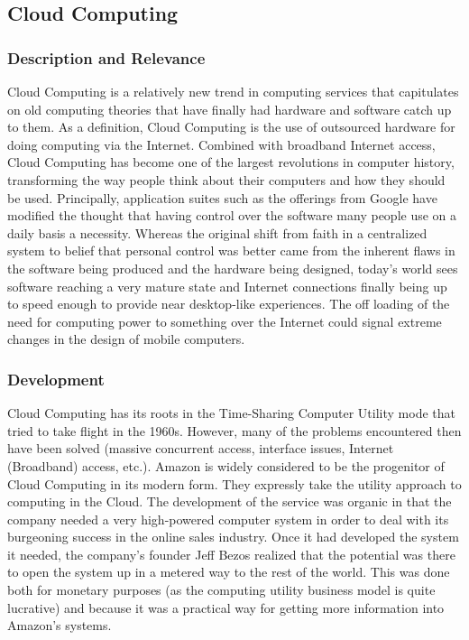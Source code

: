 \documentclass[12pt,oneside,letterpaper]{article}
\begin{document}
\subsection{Cloud Computing}

\subsubsection{Description and Relevance}

Cloud Computing is a relatively new trend in computing services that capitulates
on old computing theories that have finally had hardware and software catch up
to them.  As a definition, Cloud Computing is the use of outsourced hardware for
doing computing via the Internet.  Combined with broadband Internet access,
Cloud Computing has become one of the largest revolutions in computer history,
transforming the way people think about their computers and how they should be
used.  Principally, application suites such as the offerings from Google have
modified the thought that having control over the software many people use on a
daily basis a necessity.  Whereas the original shift from faith in a centralized
system to belief that personal control was better came from the inherent flaws
in the software being produced and the hardware being designed, today's world
sees software reaching a very mature state and Internet connections finally
being up to speed enough to provide near desktop-like experiences.  The off
loading of the need for computing power to something over the Internet could
signal extreme changes in the design of mobile computers.

\subsubsection{Development}

Cloud Computing has its roots in the Time-Sharing Computer Utility mode that
tried to take flight in the 1960s.  However, many of the problems encountered
then have been solved (massive concurrent access, interface issues, Internet
(Broadband) access, etc.).  Amazon is widely considered to be the progenitor of
Cloud Computing in its modern form.  They expressly take the utility approach to
computing in the Cloud.  The development of the service was organic in that the
company needed a very high-powered computer system in order to deal with its
burgeoning success in the online sales industry.  Once it had developed the
system it needed, the company's founder Jeff Bezos realized that the potential
was there to open the system up in a metered way to the rest of the world.  This
was done both for monetary purposes (as the computing utility business model is
quite lucrative) and because it was a practical way for getting more information
into Amazon's systems.
\end{document}
